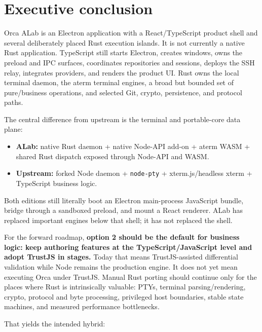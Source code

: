 \documentclass[
  10pt,
  letterpaper,
]{article}
\providecommand{\tightlist}{%
  \setlength{\itemsep}{0pt}\setlength{\parskip}{0pt}}
\begin{document}
\hypersetup{pageanchor=true}
\pagestyle{fancy}
{
\setcounter{tocdepth}{3}
\tableofcontents
}
\clearpage
{}
\section{Executive conclusion}\label{executive-conclusion}

Orca ALab is an Electron application with a React/TypeScript product
shell and several deliberately placed Rust execution islands. It is not
currently a native Rust application. TypeScript still starts Electron,
creates windows, owns the preload and IPC surfaces, coordinates
repositories and sessions, deploys the SSH relay, integrates providers,
and renders the product UI. Rust owns the local terminal daemon, the
aterm terminal engines, a broad but bounded set of pure/business
operations, and selected Git, crypto, persistence, and protocol paths.

The central difference from upstream is the terminal and portable-core
data plane:

\begin{itemize}
\tightlist
\item
  \textbf{ALab:} native Rust daemon + native Node-API add-on + aterm
  WASM + shared Rust dispatch exposed through Node-API and WASM.
\item
  \textbf{Upstream:} forked Node daemon + \texttt{node-pty} +
  xterm.js/headless xterm + TypeScript business logic.
\end{itemize}

Both editions still literally boot an Electron main-process JavaScript
bundle, bridge through a sandboxed preload, and mount a React renderer.
ALab has replaced important engines below that shell; it has not
replaced the shell.

For the forward roadmap, \textbf{option 2 should be the default for
business logic: keep authoring features at the TypeScript/JavaScript
level and adopt TrustJS in stages.} Today that means TrustJS-assisted
differential validation while Node remains the production engine. It
does not yet mean executing Orca under TrustJS. Manual Rust porting
should continue only for the places where Rust is intrinsically
valuable: PTYs, terminal parsing/rendering, crypto, protocol and byte
processing, privileged host boundaries, stable state machines, and
measured performance bottlenecks.

That yields the intended hybrid:
\end{document}
